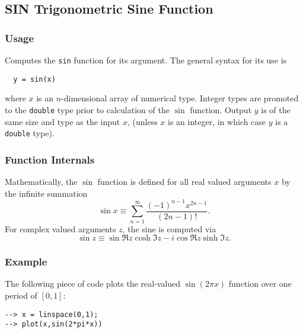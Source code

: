 %
%
%
\subsection{SIN Trigonometric Sine Function}
\subsubsection{Usage}
Computes the \verb|sin| function for its argument.  The general
syntax for its use is
\begin{verbatim}
  y = sin(x)
\end{verbatim}
where $x$ is an $n$-dimensional array of numerical type.
Integer types are promoted to the \verb|double| type prior to
calculation of the $\sin$ function.  Output $y$ is of the
same size and type as the input $x$, (unless $x$ is an
integer, in which case $y$ is a \verb|double| type).  
\subsubsection{Function Internals}
Mathematically, the $\sin$ function is defined for all real
valued arguments $x$ by the infinite summation
\[
  \sin x \equiv \sum_{n=1}^{\infty} \frac{(-1)^{n-1} x^{2n-1}}{(2n-1)!}.
\]
For complex valued arguments $z$, the sine is computed via
\[
  \sin z \equiv \sin \Re z \cosh \Im z - i \cos \Re z
  \sinh \Im z.
\]
\subsubsection{Example}
The following piece of code plots the real-valued $\sin(2\pi x)$
function over one period of $[0,1]$:
\begin{verbatim}
--> x = linspace(0,1);
--> plot(x,sin(2*pi*x))
\end{verbatim}
